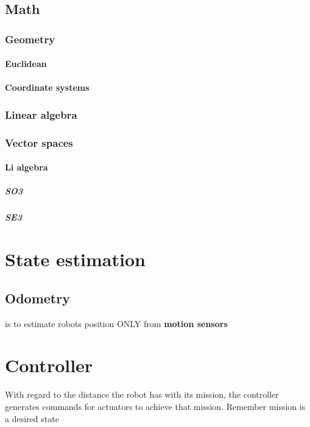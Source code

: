 \documentclass{book}
\providecommand{\ProjectSafeIncludePdf}[2][]{}
\begin{document}

\subsection{Math}

\subsubsection{Geometry}
    \paragraph{Euclidean}
        \paragraph{Coordinate systems}
        
    
    
    \subsubsection{Linear algebra}
\subsubsection{Vector spaces}
    \paragraph{Li algebra}
        \subparagraph{SO3}
        \subparagraph{SE3}


\section{State estimation}

\subsection{Odometry}
    is to estimate robots position ONLY from \textbf{motion sensors}


\section{Controller}
    \ProjectSafeIncludePdf[pages=-]{../assets/controllers.pdf}
    With regard to the distance the robot has with its mission, the controller generates commands for actuators to achieve that mission. Remember mission is a desired state
    
\end{document}
